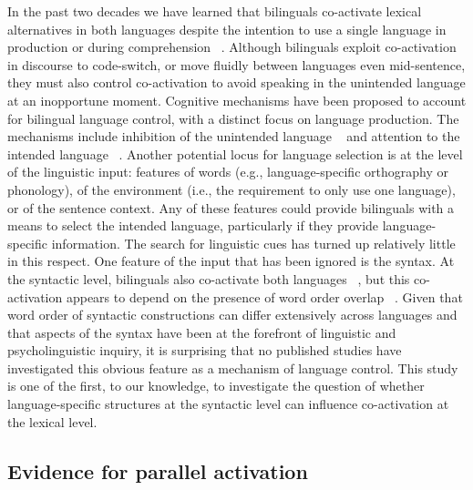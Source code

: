 In the past two decades we have learned that bilinguals co-activate lexical alternatives in both languages despite the intention to use a single language in production or during comprehension ~\citep{Dijkstra1998,Dijkstra2005,DeGroot1991,Duyck2007,Gullifer2013,VanHell2008,VanHell2002,Schwartz2006,VanAssche2009}. Although bilinguals exploit co-activation in discourse to code-switch, or move fluidly between languages even mid-sentence, they must also control co-activation to avoid speaking in the unintended language at an inopportune moment. Cognitive mechanisms have been proposed to account for bilingual language control, with a distinct focus on language production. The mechanisms include inhibition of the unintended language ~\citep{Abutalebi2007, Green1998,Green2013} and attention to the intended language ~\citep{Costa1999,Finkbeiner2006}. Another potential locus for language selection is at the level of the linguistic input: features of words (e.g., language-specific orthography or phonology), of the environment (i.e., the requirement to only use one language), or of the sentence context. Any of these features could provide bilinguals with a means to select the intended language, particularly if they provide language-specific information. The search for linguistic cues has turned up relatively little in this respect. One feature of the input that has been ignored is the syntax. At the syntactic level, bilinguals also co-activate both languages ~\citep[e.g.,][]{Loebell2003}, but this co-activation appears to depend on the presence of word order overlap ~\citep[e.g.,][]{Loebell2003,Bernolet2007}. Given that word order of syntactic constructions can differ extensively across languages and that aspects of the syntax have been at the forefront of linguistic and psycholinguistic inquiry, it is surprising that no published studies have investigated this obvious feature as a mechanism of language control. This study is one of the first, to our knowledge, to investigate the question of whether language-specific structures at the syntactic level can influence co-activation at the lexical level.

\subsection{Evidence for parallel activation}
\label{evidenceforparallelactivation}

